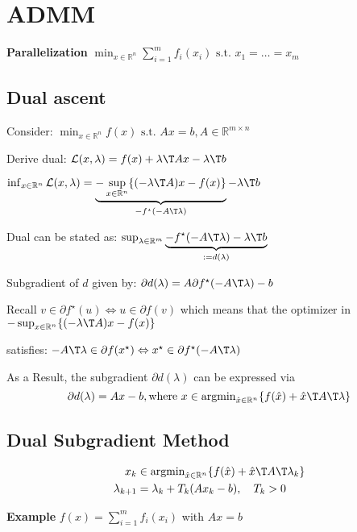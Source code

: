 \section{ADMM}

\textbf{Parallelization}
$\min_{x\in\mathbb{R}^{n}}
	\sum_{i = 1}^{m} f_i(x_i)
	\text{ s.t. }x_1=\dots=x_m$

\subsection{Dual ascent}

Consider:
$\min_{x \in \mathbb{R}^{n}} f(x)
	\text{ s.t. } Ax=b, A \in \mathbb{R}^{m\times n}$

Derive dual:
$\mathcal{L}(x,\lambda) = f(x) + \lambda\T Ax-\lambda\T  b$

$\inf_{x \in \mathbb{R}^n}\mathcal{L}(x,\lambda) =
	\underbrace{-\sup_{x\in\mathbb{R}^n}\{(-\lambda\T A)x-f(x)\}}
	_{-f^\star(-A\T\lambda)}
	-\lambda\T b$

Dual can be stated as:
$\sup_{\lambda\in\mathbb{R}^m}
	\underbrace{-f^\star(-A\T\lambda)-\lambda\T b}
	_{:=d(\lambda)}$

Subgradient of $d$ given by:
$\partial d(\lambda)=A\partial f^\star(-A\T\lambda)-b$

Recall
$v\in\partial f^\star(u) \Leftrightarrow u\in\partial f(v)$
which means that the optimizer in
$-\sup_{x\in\mathbb{R}^n}\{(-\lambda\T A)x-f(x)\}$

satisfies:
$ -A\T\lambda\in\partial f(x^\star)
	\Leftrightarrow
	x^\star\in\partial f^\star(-A\T\lambda) $

As a Result, the subgradient $\partial d(\lambda)$ can be expressed via
$$
	\partial d(\lambda)=Ax-b, \text{where }
	x\in\operatorname{argmin}_{\hat{x}\in\mathbb{R}^{n}}
	\{ f(\hat{x})+\hat{x}\T A\T\lambda \}
$$

\subsection{Dual Subgradient Method}

\vspace{-3mm}
$$\begin{aligned}
		x_k           & \in\operatorname{argmin}_{\hat{x}\in\mathbb{R}^{n}}
		\{ f(\hat{x})+\hat{x}\T A\T\lambda_k\}
		\\
		\lambda_{k+1} & =\lambda_k+T_k(Ax_k-b),\quad T_k>0
	\end{aligned} $$

\textbf{Example}
$f(x)=\sum_{i = 1}^{m} f_i(x_i)$ with $Ax=b$

